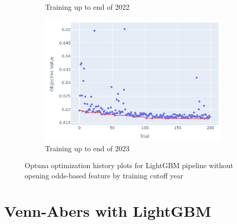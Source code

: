 \documentclass[12pt,twoside]{report}
\begin{document}
\begin{figure}[htb]
\begin{subfigure}{.33\linewidth}
  \caption{Training up to end of 2022}
\end{subfigure}%
\begin{subfigure}{.33\linewidth}
  \centering
  \includegraphics[width=0.95\linewidth]{figures/lightgbm_no_odds_cutoff_2023.png}
  \caption{Training up to end of 2023}
\end{subfigure}
\par\bigskip
\caption{Optuna optimization history plots for LightGBM pipeline without opening odds-based feature by training cutoff year}
\end{figure}

\newpage
\section{Venn-Abers with LightGBM}
\end{document}
